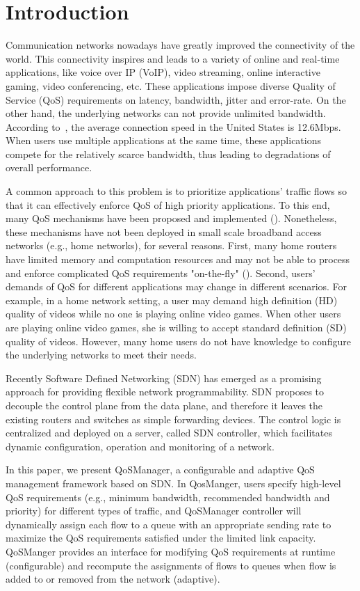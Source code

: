 \section{Introduction}
\label{sect:intro}

Communication networks nowadays have greatly improved the connectivity of the world. This connectivity
inspires and leads to a variety of online and real-time applications, like voice over IP (VoIP), video
streaming, online interactive gaming, video conferencing, etc. These applications impose diverse Quality
of Service (QoS) requirements on latency, bandwidth, jitter and error-rate. On the other hand, the
underlying networks can not provide unlimited bandwidth. According to~\cite{akamai}, the average
connection speed in the United States is 12.6Mbps. When users use multiple applications at the same time,
these applications compete for the relatively scarce bandwidth, thus leading to degradations of overall
performance.

A common approach to this problem is to prioritize applications' traffic flows so that it can effectively
enforce QoS of high priority applications. To this end, many QoS mechanisms have been proposed and
implemented (). Nonetheless, these mechanisms have not been deployed in small scale broadband
access networks (e.g., home networks), for several reasons. First, many home routers have limited memory and
computation resources and may not be able to process and enforce complicated QoS requirements "on-the-fly"
(). Second, users' demands of QoS for different applications may change in different scenarios. 
For example, in a home network setting, a user may demand high definition (HD) quality of videos while no one
is playing online video games. When other users are playing online video games, she is willing to accept standard
definition (SD) quality of videos. However, many home users do not have knowledge to configure the underlying
networks to meet their needs.

Recently Software Defined Networking (SDN) has emerged as a promising approach for providing flexible network
programmability. SDN proposes to decouple the control plane from the data plane, and therefore it leaves the
existing routers and switches as simple forwarding devices. The control logic is centralized and deployed on a
server, called SDN controller, which facilitates dynamic configuration, operation and monitoring of a network.

In this paper, we present QoSManager, a configurable and adaptive QoS management framework based on SDN. In
QosManger, users specify high-level QoS requirements (e.g., minimum bandwidth, recommended bandwidth and priority)
for different types of traffic, and QoSManager controller will dynamically assign each flow to a queue with an
appropriate sending rate to maximize the QoS requirements satisfied under the limited link capacity. QoSManger
provides an interface for modifying QoS requirements at runtime (configurable) and recompute the assignments of
flows to queues when flow is added to or removed from the network (adaptive).

